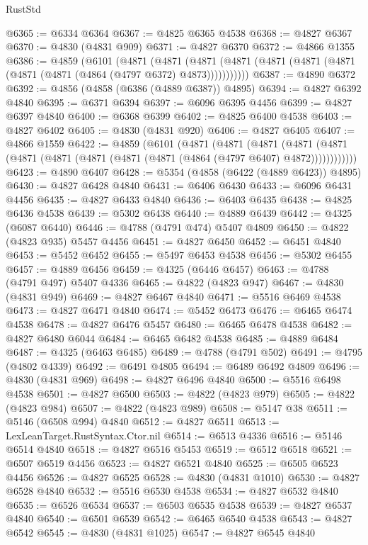 \begin{lexlean}{RustStd}
\begin{coremodule}
@6365 := @6334 @6364
@6367 := @4825 @6365 @4538
@6368 := @4827 @6367
@6370 := @4830 (@4831 @909)
@6371 := @4827 @6370
@6372 := @4866 @1355
@6386 := @4859
    (@6101
      (@4871
        (@4871
          (@4871 (@4871 (@4871 (@4871 (@4871 (@4871 (@4871 (@4864 (@4797 @6372) @4873)))))))))))
@6387 := @4890 @6372
@6392 := @4856 (@4858 (@6386 (@4889 @6387)) @4895)
@6394 := @4827 @6392 @4840
@6395 := @6371 @6394
@6397 := @6096 @6395 @4456
@6399 := @4827 @6397 @4840
@6400 := @6368 @6399
@6402 := @4825 @6400 @4538
@6403 := @4827 @6402
@6405 := @4830 (@4831 @920)
@6406 := @4827 @6405
@6407 := @4866 @1559
@6422 := @4859
    (@6101
      (@4871
        (@4871
          (@4871
            (@4871 (@4871 (@4871 (@4871 (@4871 (@4871 (@4871 (@4864 (@4797 @6407) @4872))))))))))))
@6423 := @4890 @6407
@6428 := @5354 (@4858 (@6422 (@4889 @6423)) @4895)
@6430 := @4827 @6428 @4840
@6431 := @6406 @6430
@6433 := @6096 @6431 @4456
@6435 := @4827 @6433 @4840
@6436 := @6403 @6435
@6438 := @4825 @6436 @4538
@6439 := @5302 @6438
@6440 := @4889 @6439
@6442 := @4325 (@6087 @6440)
@6446 := @4788 (@4791 @474) @5407 @4809
@6450 := @4822 (@4823 @935) @5457 @4456
@6451 := @4827 @6450
@6452 := @6451 @4840
@6453 := @5452 @6452
@6455 := @5497 @6453 @4538
@6456 := @5302 @6455
@6457 := @4889 @6456
@6459 := @4325 (@6446 @6457)
@6463 := @4788 (@4791 @497) @5407 @4336
@6465 := @4822 (@4823 @947)
@6467 := @4830 (@4831 @949)
@6469 := @4827 @6467 @4840
@6471 := @5516 @6469 @4538
@6473 := @4827 @6471 @4840
@6474 := @5452 @6473
@6476 := @6465 @6474 @4538
@6478 := @4827 @6476 @5457
@6480 := @6465 @6478 @4538
@6482 := @4827 @6480 @6044
@6484 := @6465 @6482 @4538
@6485 := @4889 @6484
@6487 := @4325 (@6463 @6485)
@6489 := @4788 (@4791 @502)
@6491 := @4795 (@4802 @4339)
@6492 := @6491 @4805
@6494 := @6489 @6492 @4809
@6496 := @4830 (@4831 @969)
@6498 := @4827 @6496 @4840
@6500 := @5516 @6498 @4538
@6501 := @4827 @6500
@6503 := @4822 (@4823 @979)
@6505 := @4822 (@4823 @984)
@6507 := @4822 (@4823 @989)
@6508 := @5147 @38
@6511 := @5146 (@6508 @994) @4840
@6512 := @4827 @6511
@6513 := LexLeanTarget.RustSyntax.Ctor.nil
@6514 := @6513 @4336
@6516 := @5146 @6514 @4840
@6518 := @4827 @6516 @5453
@6519 := @6512 @6518
@6521 := @6507 @6519 @4456
@6523 := @4827 @6521 @4840
@6525 := @6505 @6523 @4456
@6526 := @4827 @6525
@6528 := @4830 (@4831 @1010)
@6530 := @4827 @6528 @4840
@6532 := @5516 @6530 @4538
@6534 := @4827 @6532 @4840
@6535 := @6526 @6534
@6537 := @6503 @6535 @4538
@6539 := @4827 @6537 @4840
@6540 := @6501 @6539
@6542 := @6465 @6540 @4538
@6543 := @4827 @6542
@6545 := @4830 (@4831 @1025)
@6547 := @4827 @6545 @4840

\end{coremodule}
\end{lexlean}

